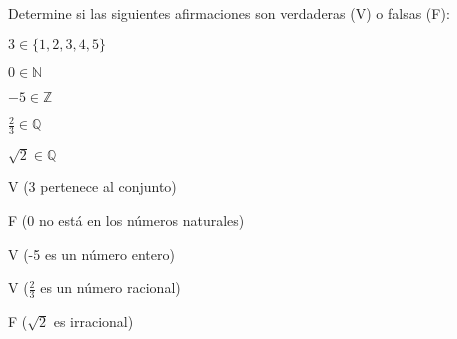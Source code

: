 \begin{exercise}
\problem Determine si las siguientes afirmaciones son verdaderas (V) o falsas (F):

\begin{exerciselist}
    \item $3 \in \{1, 2, 3, 4, 5\}$ \hspace{2cm} \underline{\hspace{2cm}}
    \item $0 \in \mathbb{N}$ \hspace{2cm} \underline{\hspace{2cm}}
    \item $-5 \in \mathbb{Z}$ \hspace{2cm} \underline{\hspace{2cm}}
    \item $\frac{2}{3} \in \mathbb{Q}$ \hspace{2cm} \underline{\hspace{2cm}}
    \item $\sqrt{2} \in \mathbb{Q}$ \hspace{2cm} \underline{\hspace{2cm}}
\end{exerciselist}

\begin{solucion}
\begin{exerciselist}
    \item V (3 pertenece al conjunto)
    \item F (0 no está en los números naturales)
    \item V (-5 es un número entero)
    \item V ($\frac{2}{3}$ es un número racional)
    \item F ($\sqrt{2}$ es irracional)
\end{exerciselist}
\end{solucion}
\end{exercise}


